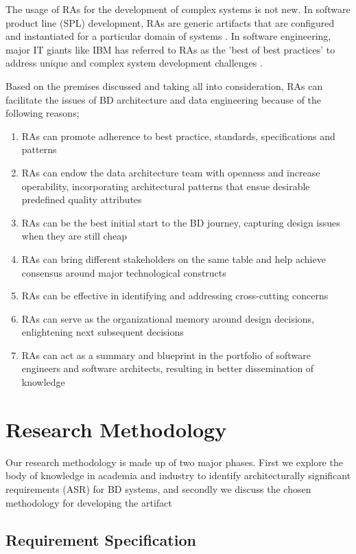 \documentclass[review]{elsarticle}
\begin{document}
The usage of RAs for the development of complex systems is not new. In software product line (SPL) development, RAs are generic artifacts that are configured and instantiated for a particular domain of systems \cite{Derras}. In software engineering, major IT giants like IBM has referred to RAs as the 'best of best practices' to address unique and complex system development challenges \cite{Cloutier}.

Based on the premises discussed and taking all into consideration, RAs can facilitate the issues of BD architecture and data engineering because of the following reasons;

\begin{enumerate}
    \item RAs can promote adherence to best practice, standards, specifications and patterns
    \item RAs can endow the data architecture team with openness and increase operability, incorporating architectural patterns that ensue desirable predefined quality attributes
    \item RAs can be the best initial start to the BD journey, capturing design issues when they are still cheap
    \item RAs can bring different stakeholders on the same table and help achieve consensus around major technological constructs
    \item RAs can be effective in identifying and addressing cross-cutting concerns
    \item RAs can serve as the organizational memory around design decisions, enlightening next subsequent decisions
    \item RAs can act as a summary and blueprint in the portfolio of software engineers and software architects, resulting in better dissemination of knowledge
\end{enumerate}

\section{Research Methodology}

Our research methodology is made up of two major phases. First we explore the body of knowledge in academia and industry to identify architecturally significant requirements (ASR) for BD systems, and secondly we discuss the chosen methodology for developing the artifact


\subsection{Requirement Specification} \label{requirement-spec-methodology}
\end{document}
